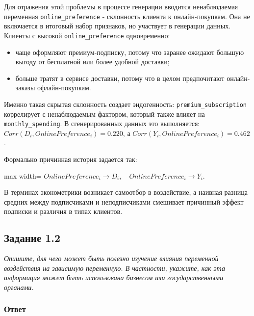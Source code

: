 \documentclass[11pt]{article}
\newenvironment{tasktext}
      {\begin{tcolorbox}[breakable, colback=black!3, colframe=black!28,
        boxrule=0.4pt, arc=1.5mm, left=7pt, right=7pt, top=5pt, bottom=5pt,
        before skip=0.35em, after skip=0.75em]\itshape}
      {\end{tcolorbox}}
\providecommand{\tightlist}{%
      \setlength{\itemsep}{0pt}\setlength{\parskip}{0pt}}
\begin{document}
Для отражения этой проблемы в процессе генерации вводится ненаблюдаемая
переменная \texttt{online\_preference} - склонность клиента к
онлайн-покупкам. Она не включается в итоговый набор признаков, но
участвует в генерации данных. Клиенты с высокой
\texttt{online\_preference} одновременно:

\begin{itemize}
\tightlist
\item
  чаще оформляют премиум-подписку, потому что заранее ожидают большую
  выгоду от бесплатной или более удобной доставки;
\item
  больше тратят в сервисе доставки, потому что в целом предпочитают
  онлайн-заказы офлайн-покупкам.
\end{itemize}

Именно такая скрытая склонность создает эндогенность:
\texttt{premium\_subscription} коррелирует с ненаблюдаемым фактором,
который также влияет на \texttt{monthly\_spending}. В сгенерированных
данных это выполняется: \(Corr(D_i, OnlinePreference_i) = 0.220\), а
\(Corr(Y_i, OnlinePreference_i) = 0.462\).

Формально причинная история задается так:

\begin{center}
\begin{adjustbox}{max width=\linewidth}
\(\displaystyle OnlinePreference_i \rightarrow D_i, \quad OnlinePreference_i \rightarrow Y_i.\)
\end{adjustbox}
\end{center}

В терминах эконометрики возникает самоотбор в воздействие, а наивная
разница средних между подписчиками и неподписчиками смешивает причинный
эффект подписки и различия в типах клиентов.

\subsection{Задание 1.2}\label{ux437ux430ux434ux430ux43dux438ux435-1.2}

\begin{tasktext}
Опишите, для чего может быть полезно изучение влияния переменной
воздействия на зависимую переменную. В частности, укажите, как эта
информация может быть использована бизнесом или государственными
органами.
\end{tasktext}

\subsubsection{Ответ}\label{ux43eux442ux432ux435ux442-1}
\end{document}
